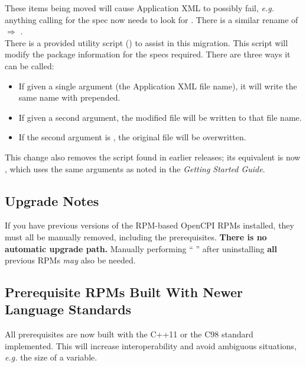 These items being moved will cause Application XML to possibly fail, \textit{e.g.} anything calling for the  spec now needs to look for . There is a similar rename of  $\Rightarrow$ .\\

There is a provided utility script () to assist in this migration. This script will modify the package information for the specs required. There are three ways it can be called:
\begin{itemize}
\setlength\itemsep{0em} %
\item If given a single argument (the Application XML file name), it will write the same name with  prepended.
\item If given a second argument, the modified file will be written to that file name.
\item If the second argument is , the original file will be overwritten.
\end{itemize}

This change also removes the  script found in earlier releases; its equivalent is now , which uses the same arguments as noted in the \textit{Getting Started Guide}.

\subsection{Upgrade Notes} %
If you have previous versions of the RPM-based OpenCPI RPMs installed, they must all be manually removed, including the prerequisites. \textbf{There is no automatic upgrade path.} Manually performing `` '' after uninstalling \textbf{all} previous RPMs \textit{may} also be needed.

\subsection{Prerequisite RPMs Built With Newer Language Standards} %
All prerequisites are now built with the C++11 or the C98 standard implemented. This will increase interoperability and avoid ambiguous situations, \textit{e.g.} the size of a  variable.

